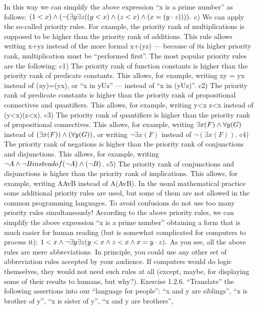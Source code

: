 In this way we can simplify the above expression ``x is a prime number'' as follows:
\((1<x)\wedge (\neg (\exists y\exists z((y<x)\wedge (z<x)\wedge (x=(y\cdot z)))).\)
c) We can apply the so-called priority rules. For example, the priority rank of multiplications is supposed
to be higher than the priority rank of additions. This rule allows writing x+y\cdot z instead of the more formal
x+(y\cdot z) --- because of its higher priority rank, multiplication must be ``performed first''. The most popular
priority rules are the following:
c1) The priority rank of function constants is higher than the priority rank of predicate constants. This
allows, for example, writing x\cdot y = y\cdot x instead of (x\cdot y)=(y\cdot x), or ``x in yUz'' --- instead of ``x in (yUz)''.
c2) The priority rank of predicate constants is higher than the priority rank of propositional connectives
and quantifiers. This allows, for example, writing y<x \AND  z<x instead of (y<x)\AND (z<x).
c3) The priority rank of quantifiers is higher than the priority rank of propositional connectives. This
allows, for example, writing \(\exists x(F)\wedge \forall y(G)\) instead of \((\exists x(F))\wedge (\forall y(G))\), or writing \(\neg \exists x(F)\) instead of \(\neg (\exists x(F))\).
c4) The priority rank of negations is higher than the priority rank of conjunctions and disjunctions. This allows, for example, writing \(\neg A\wedge \neg B instead of (\neg A)\wedge (\neg B)\).
c5) The priority rank of conjunctions and disjunctions is higher than the priority rank of implications.
This allows, for example, writing A\IMPLIES AvB instead of A\IMPLIES (AvB).
In the usual mathematical practice some additional priority rules are used, but some of them are not
allowed in the common programming languages. To avoid confusions do not use too many priority rules
simultaneously!
According to the above priority rules, we can simplify the above expression ``x is a prime number''
obtaining a form that is much easier for human reading (but is somewhat complicated for computers to
process it):
\(1<x \wedge  \neg \exists y\exists z(y<x \wedge  z<x \wedge  x=y\cdot z).\)
As you see, all the above rules are mere abbreviations. In principle, you could use any other set of
abbreviation rules accepted by your audience. If computers would do logic themselves, they would not
need such rules at all (except, maybe, for displaying some of their results to humans, but why?).
Exercise 1.2.6. ``Translate'' the following assertions into our ``language for people'':
``x and y are siblings'',
``x is brother of y'', ``x is sister of y'',
``x and y are brothers'',
